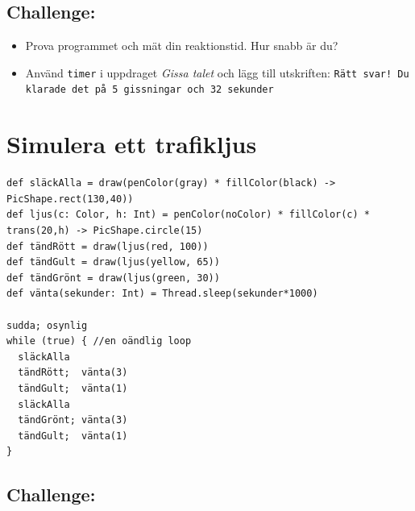 \section*{\color{BrickRed}Challenge:}


\begin{itemize}

\item {Prova programmet och mät din reaktionstid. Hur snabb är du?}
\item {Använd \lstinline{timer} i uppdraget {\it Gissa talet} och lägg till utskriften: \lstinline{Rätt svar! Du klarade det på 5 gissningar och 32 sekunder}}

\end{itemize}


\chapter{Simulera ett trafikljus}
  

\begin{lstlisting}[basicstyle={\ttfamily\fontsize{14}{17}\selectfont},numbers=none]
def släckAlla = draw(penColor(gray) * fillColor(black) -> PicShape.rect(130,40))
def ljus(c: Color, h: Int) = penColor(noColor) * fillColor(c) * trans(20,h) -> PicShape.circle(15)
def tändRött = draw(ljus(red, 100))
def tändGult = draw(ljus(yellow, 65))
def tändGrönt = draw(ljus(green, 30))
def vänta(sekunder: Int) = Thread.sleep(sekunder*1000)

sudda; osynlig  
while (true) { //en oändlig loop
  släckAlla
  tändRött;  vänta(3)
  tändGult;  vänta(1) 
  släckAlla
  tändGrönt; vänta(3)
  tändGult;  vänta(1)
}
\end{lstlisting}
        
\section*{\color{BrickRed}Challenge:}


